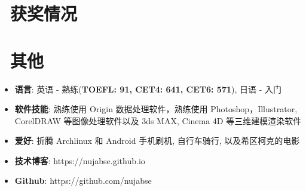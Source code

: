 \documentclass{resume}
\begin{document}
\section{\faHeartO\ 获奖情况}

\section{\faInfo\ 其他}
\begin{itemize}[parsep=0.5ex]
  \item \textbf{语言}: 英语 - 熟练(\textbf{TOEFL: 91,  CET4: 641, CET6: 571}), 日语 - 入门
  \item \textbf{软件技能}: 熟练使用 Origin 数据处理软件，熟练使用 Photoshop，Illustrator, CorelDRAW 等图像处理软件以及 3ds MAX, Cinema 4D 等三维建模渲染软件
  \item \textbf{爱好}: 折腾 Archlinux 和 Android 手机刷机, 自行车骑行, 以及希区柯克的电影
  \item \textbf{技术博客}: https://nujabse.github.io
  \item \textbf{Github}: https://github.com/nujabse
\end{itemize}

%
%
\end{document}

